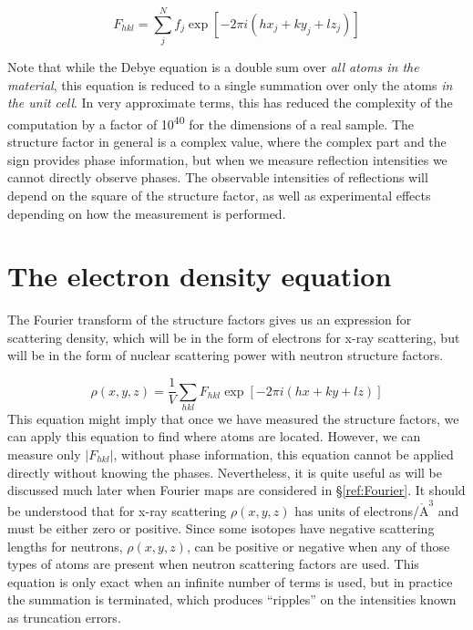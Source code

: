 $$F_{hkl}=\sum_j^N f_j \exp⁡[-2\pi i(hx_j + ky_j + lz_j)]$$

Note that while the Debye equation is a double sum over \textit{all atoms in the material}, this equation is reduced to a single summation over only the atoms \textit{in the unit cell}.
In very approximate terms, this has reduced the complexity of the computation by a factor of 10\textsuperscript{40} for the dimensions of a real sample. 
The structure factor in general is a complex value, where the complex part and the sign provides phase information, but when we measure reflection intensities we cannot directly observe phases. The observable intensities of reflections will depend on the square of the structure factor, as well as experimental effects depending on how the measurement is performed. 

\section{The electron density equation}\label{ref:rho}
The Fourier transform of the structure factors gives us an expression for scattering density, which will be in the form of electrons for x-ray scattering, but will be in the form of nuclear scattering power with neutron structure factors. 

$$\rho(x,y,z) = \frac{1}{V} \sum_{hkl}  F_{hkl} \exp⁡[-2\pi i(hx + ky + lz)] $$
This equation might imply that once we have measured the structure factors, we can apply this equation to find where atoms are located. However, we can measure only $|F_{hkl}|$, without phase information, this equation cannot be applied directly without knowing the phases. Nevertheless, it is quite useful as will be discussed much later when Fourier maps are considered in \S\ref{ref:Fourier}. It should be understood that for x-ray scattering $\rho(x,y,z)$ has units of electrons/$\mathring{\text{A}}^3$ and must be either zero or positive. Since some isotopes have negative scattering lengths for neutrons, $\rho(x,y,z)$, can be positive or negative when any of those types of atoms are present when neutron scattering factors are used. This equation is only exact when an infinite number of terms is used, but in practice the summation is terminated, which produces ``ripples'' on the intensities known as truncation errors. 

